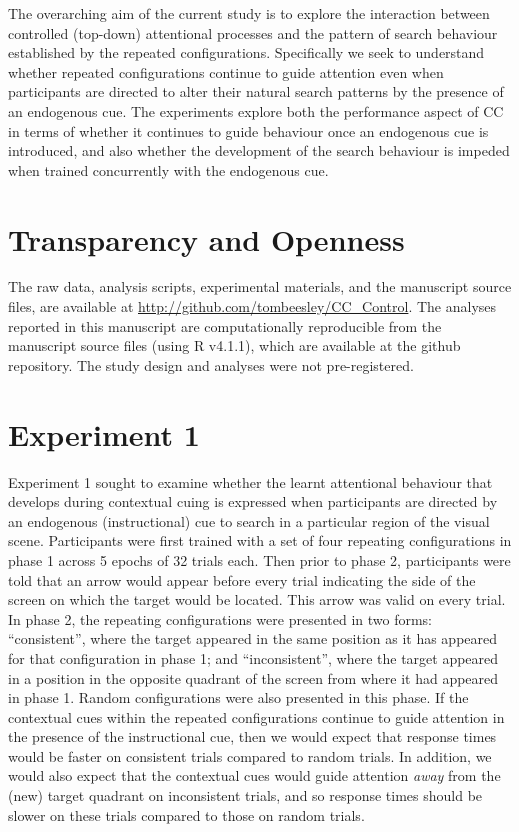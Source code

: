 \documentclass[
  man,floatsintext]{apa7}
\begin{document}
The overarching aim of the current study is to explore the interaction between controlled (top-down) attentional processes and the pattern of search behaviour established by the repeated configurations. Specifically we seek to understand whether repeated configurations continue to guide attention even when participants are directed to alter their natural search patterns by the presence of an endogenous cue. The experiments explore both the performance aspect of CC in terms of whether it continues to guide behaviour once an endogenous cue is introduced, and also whether the development of the search behaviour is impeded when trained concurrently with the endogenous cue.

\hypertarget{transparency-and-openness}{%
\section{Transparency and Openness}\label{transparency-and-openness}}

The raw data, analysis scripts, experimental materials, and the manuscript source files, are available at \url{http://github.com/tombeesley/CC_Control}. The analyses reported in this manuscript are computationally reproducible from the manuscript source files (using R v4.1.1), which are available at the github repository. The study design and analyses were not pre-registered.

\hypertarget{experiment-1}{%
\section{Experiment 1}\label{experiment-1}}

Experiment 1 sought to examine whether the learnt attentional behaviour that develops during contextual cuing is expressed when participants are directed by an endogenous (instructional) cue to search in a particular region of the visual scene. Participants were first trained with a set of four repeating configurations in phase 1 across 5 epochs of 32 trials each. Then prior to phase 2, participants were told that an arrow would appear before every trial indicating the side of the screen on which the target would be located. This arrow was valid on every trial. In phase 2, the repeating configurations were presented in two forms: ``consistent'', where the target appeared in the same position as it has appeared for that configuration in phase 1; and ``inconsistent'', where the target appeared in a position in the opposite quadrant of the screen from where it had appeared in phase 1. Random configurations were also presented in this phase. If the contextual cues within the repeated configurations continue to guide attention in the presence of the instructional cue, then we would expect that response times would be faster on consistent trials compared to random trials. In addition, we would also expect that the contextual cues would guide attention \emph{away} from the (new) target quadrant on inconsistent trials, and so response times should be slower on these trials compared to those on random trials.
\end{document}
